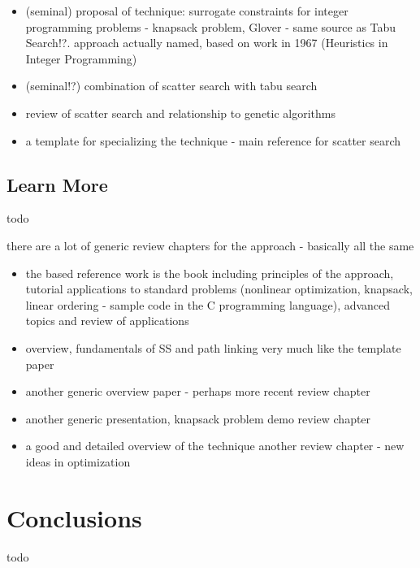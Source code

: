 \documentclass[a4paper, 11pt]{article}
\begin{document}
\begin{itemize}
	\item (seminal) proposal of technique: surrogate constraints for integer programming problems - knapsack problem, Glover \cite{Glover1977} - same source as Tabu Search!?. approach actually named, based on work in 1967 (Heuristics in Integer Programming)
	\item (seminal!?) combination of scatter search with tabu search \cite{Glover1994a}
	\item review of scatter search and relationship to genetic algorithms \cite{Glover1994}
	\item a template for specializing the technique \cite{Glover1998a} - main reference for scatter search
\end{itemize}

% 
% 
\subsection{Learn More}
todo

there are a lot of generic review chapters for the approach - basically all the same

\begin{itemize}
	\item the based reference work is the book \cite{Laguna2003} including principles of the approach, tutorial applications to standard problems (nonlinear optimization, knapsack, linear ordering - sample code in the C programming language), advanced topics and review of applications
	\item overview, fundamentals of SS and path linking \cite{Glover2000} very much like the template paper
	\item another generic overview paper - perhaps more recent \cite{Martia2006} review chapter
	\item another generic presentation, knapsack problem demo \cite{Laguna2002} review chapter
	\item a good and detailed overview of the technique \cite{Glover1999} another review chapter - new ideas in optimization
\end{itemize}


% 
% 
\section{Conclusions}
\label{sec:conclusions}
todo
\end{document}

